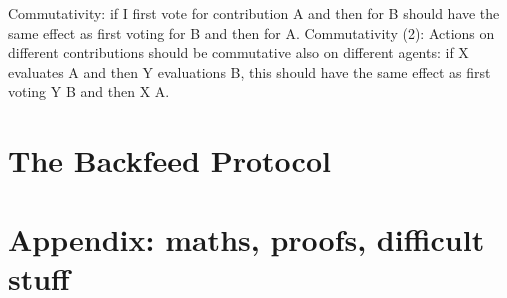 \documentclass{article}
\begin{document}
Commutativity: if I first vote for contribution A and then for B should have the same effect as first voting for B and then for A.
Commutativity (2): Actions on different contributions should be commutative also on different agents: if X evaluates A and then Y evaluations B, this should have the same effect as first voting Y B and then X A.


\section{The Backfeed Protocol}

\section{Appendix: maths, proofs, difficult stuff}
\end{document}
